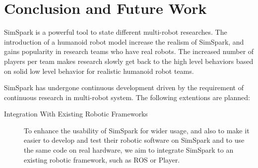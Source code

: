 \documentclass{llncs}
\begin{document}
\section{Conclusion and Future Work}
\label{s:conclusion}
SimSpark is a powerful tool to state different multi-robot researches.
The introduction of a humanoid robot model increase the realism of SimSpark, and gains popularity in research teams who have real robots.
The increased number of players per team makes research slowly get back to the high level behaviors based on solid low level behavior for realistic humanoid robot teams.

SimSpark has undergone continuous development driven by the requirement of continuous research in multi-robot system. The following extentions are planned:
\begin{description}
\item[Integration With Existing Robotic Frameworks] 
To enhance the usability of SimSpark for wider usage, and also to make it easier to develop and test their robotic software on SimSpark and to
use the same code on real hardware, we aim to integrate SimSpark to an 
existing robotic framework, such as ROS or Player.





\end{description}
\end{document}
